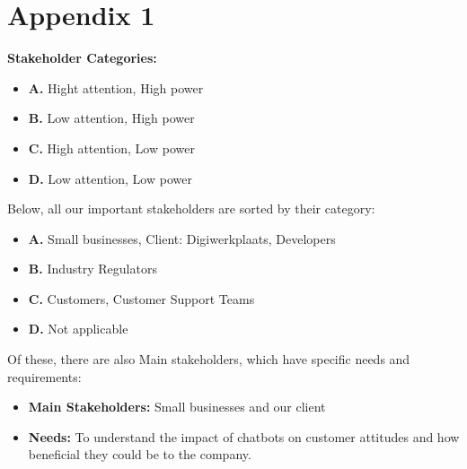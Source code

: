 \documentclass[a4paper]{article}
\begin{document}
\section*{Appendix 1}
\textbf{Stakeholder Categories:}
\begin{itemize}
 \item \textbf{A.} Hight attention, High power
 \item \textbf{B.} Low attention, High power
 \item \textbf{C.} High attention, Low power
 \item \textbf{D.} Low attention, Low power
\end{itemize}
Below, all our important stakeholders are sorted by their category:
\begin{itemize}
 \item \textbf{A.} Small businesses, Client: Digiwerkplaats, Developers
 \item \textbf{B.} Industry Regulators
 \item \textbf{C.} Customers, Customer Support Teams
 \item \textbf{D.} Not applicable
\end{itemize}
Of these, there are also Main stakeholders, which have specific needs and requirements:
\begin{itemize}
    \item \textbf{Main Stakeholders:} Small businesses and our client
    \item \textbf{Needs:} To understand the impact of chatbots on customer attitudes and how beneficial they could be to the company.
\end{itemize}
\end{document}
